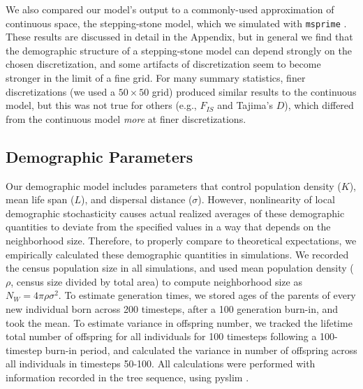 \documentclass[10pt,twoside,lineno,hidelinks]{preprint}
\begin{document}
We also compared our model's output to a commonly-used approximation of continuous space,
the stepping-stone model, which we simulated with \texttt{msprime} \citep{Kelleher2016}.
These results are discussed in detail in the Appendix,
but in general we find that the demographic structure of a stepping-stone model
can depend strongly on the chosen discretization,
and some artifacts of discretization seem to become stronger in the limit of a fine grid.
For many summary statistics, finer discretizations (we used a $50 \times 50$ grid)
produced similar results to the continuous model,
but this was not true for others (e.g., $F_{IS}$ and Tajima's $D$),
which differed from the continuous model \emph{more} at finer discretizations.

\subsection{Demographic Parameters}

Our demographic model includes parameters that control population density ($K$), 
mean life span ($L$), and dispersal distance ($\sigma$).
However, nonlinearity of local demographic stochasticity causes
actual realized averages of these demographic quantities to deviate from the specified values
in a way that depends on the neighborhood size.
Therefore, to properly compare to theoretical expectations,
we empirically calculated these demographic quantities in simulations. 
We recorded the census population size in all simulations,
and used mean population density ($\rho$, census size divided by total area)
to compute neighborhood size as $N_W = 4 \pi \rho \sigma^2$.  
To estimate generation times, we stored ages of the parents of every new individual born across 200 timesteps, 
after a 100 generation burn-in, and took the mean. 
To estimate variance in offspring number, 
we tracked the lifetime total number of offspring for all individuals for 100 timesteps following a 100-timestep burn-in period,
and calculated the variance in number of offspring across all individuals in timesteps 50-100.
All calculations were performed with information recorded in the tree sequence,
using pyslim \citep{pyslim}.
\end{document}
